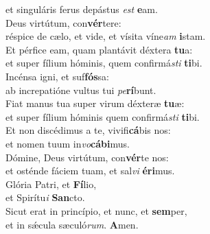 \evenverse et singuláris ferus depástus \textit{est} \textbf{e}am.\\
\oddverse Deus virtútum, con\textbf{vér}tere:~\*\\
\oddverse réspice de cælo, et vide, et vísita víne\textit{am} \textbf{i}stam.\\
\evenverse Et pérfice eam, quam plantávit déxtera \textbf{tu}a:~\*\\
\evenverse et super fílium hóminis, quem confirmá\textit{sti} \textbf{ti}bi.\\
\oddverse Incénsa igni, et suf\textbf{fós}sa:~\*\\
\oddverse ab increpatióne vultus tui \textit{pe}\textbf{rí}bunt.\\
\evenverse Fiat manus tua super virum déxteræ \textbf{tu}æ:~\*\\
\evenverse et super fílium hóminis quem confirmá\textit{sti} \textbf{ti}bi.\\
\oddverse Et non discédimus a te, vivifi\textbf{cá}bis nos:~\*\\
\oddverse et nomen tuum in\textit{vo}\textbf{cá}\textbf{bi}mus.\\
\evenverse Dómine, Deus virtútum, con\textbf{vér}te nos:~\*\\
\evenverse et osténde fáciem tuam, et sal\textit{vi} \textbf{é}\textbf{ri}mus.\\
\oddverse Glória Patri, et \textbf{Fí}lio,~\*\\
\oddverse et Spirítu\textit{i} \textbf{San}cto.\\
\evenverse Sicut erat in princípio, et nunc, et \textbf{sem}per,~\*\\
\evenverse et in sǽcula sæculó\textit{rum}. \textbf{A}men.\\
